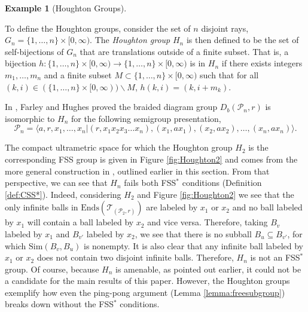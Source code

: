 \documentclass[12pt]{amsart}
\numberwithin{equation}{subsection}
\theoremstyle{definition}
\theoremstyle{definition}
\newtheorem{example}[theorem]{Example}
\theoremstyle{remark}
\begin{document}
\begin{example}[Houghton Groups]\label{ex:Hough2}

    To define the Houghton groups, consider the set of $n$ disjoint rays, $G_n = \{ 1, \dots , n\} \times [0,\infty)$. The \textit{Houghton group} $H_n$ is then defined to be the set of self-bijections of $G_n$ that are translations outside of a finite subset. That is, a bijection $h: \{ 1, \dots , n\} \times [0,\infty) \rightarrow \{ 1, \dots , n\} \times [0,\infty)$ is in $H_n$ if there exists integers $m_1, \dots, m_n$ and a finite subset $M \subset \{ 1, \dots , n\} \times [0,\infty)$ such that for all $(k,i) \in (\{ 1, \dots , n\} \times [0,\infty))\backslash M$, $h(k,i) = (k,i+m_k)$. 

    In \cite{hughes2017braided}, Farley and Hughes proved the braided diagram group $D_b(\mathcal P_n,r)$ is isomorphic to $H_n$ for the following semigroup presentation,
    \[\mathcal P_n = \langle a, r, x_1, \dots, x_n \vert (r,x_1x_2x_3\dots x_n), (x_1,ax_1), (x_2,ax_2), \dots , (x_n,ax_n)\rangle.\]
    

    The compact ultrametric space for which the Houghton group $H_2$ is the corresponding FSS group is given in Figure \ref{fig:Houghton2} and comes from the more general construction in  \cite{hughes2017braided}, outlined earlier in this section. From that perspective, we can see that $H_n$ fails both FSS$^*$ conditions (Definition \ref{def:CSS*}). Indeed, considering $H_2$ and Figure \ref{fig:Houghton2} we see that the only infinite balls in $\text{Ends}(\mathcal T_{(\mathcal P_2, r)})$ are labeled by $x_1$ or $x_2$ and no ball labeled by $x_1$ will contain a ball labeled by $x_2$ and vice versa. Therefore, taking $B_v$ labeled by $x_1$ and $B_{v'}$ labeled by $x_2$, we see that there is no subball $B_u \subseteq B_{v'}$, for which $\text{Sim}(B_v,B_u)$ is nonempty. It is also clear that any infinite ball labeled by $x_1$ or $x_2$ does not contain two disjoint infinite balls. Therefore, $H_n$ is not an FSS$^*$ group. Of course, because $H_n$ is amenable, as pointed out earlier, it could not be a candidate for the main results of this paper. However, the Houghton groups exemplify how even the ping-pong argument (Lemma  \ref{lemma:freesubgroup}) breaks down without the FSS$^*$ conditions. 

    
\end{example}
\end{document}
